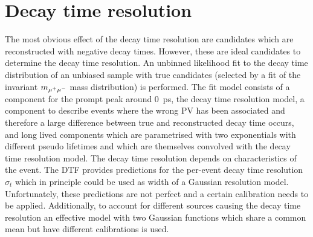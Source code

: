 \section{Decay time resolution}
\label{sec:bd2jpsiks:decaytime:resolution}

The most obvious effect of the decay time resolution are candidates which are
reconstructed with negative decay times. However, these are ideal candidates
to determine the decay time resolution. An unbinned likelihood fit to the
decay time distribution of an unbiased \BdToJPsiKS sample with true \jpsi
candidates (selected by a fit of the invariant $m_{{\mu^+\mu^-}}$ mass distribution)
is performed. The fit model consists of a component for the prompt peak around
\SI{0}{\ps}, \ie the decay time resolution model, a component to describe
events where the wrong PV has been associated and therefore a large difference
between true and reconstructed decay time occurs, and long lived components
which are parametrised with two exponentials with different pseudo lifetimes
and which are themselves convolved with the decay time resolution model. The
decay time resolution depends on characteristics of the event. The DTF
provides predictions for the per-event decay time resolution $\sigma_t$ which
in principle could be used as width of a Gaussian resolution model.
Unfortunately, these predictions are not perfect and a certain calibration
needs to be applied. Additionally, to account for different sources causing
the decay time resolution an effective model with two Gaussian functions which
share a common mean but have different calibrations is used.

